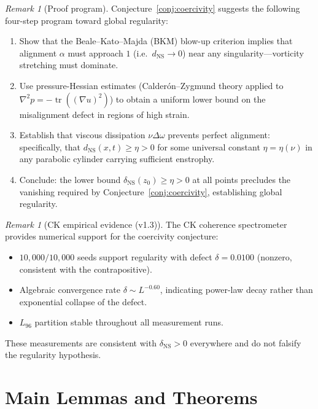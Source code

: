 \documentclass[11pt]{article}
\theoremstyle{definition}
\theoremstyle{remark}
\newtheorem{remark}[theorem]{Remark}
\DeclareMathOperator{\tr}{tr}
\begin{document}
\begin{remark}[Proof program]
\label{rem:proof-program}
Conjecture~\ref{conj:coercivity} suggests the following four-step
program toward global regularity:
\begin{enumerate}[leftmargin=2em]
\item Show that the Beale--Kato--Majda (BKM) blow-up criterion implies
  that alignment $\alpha$ must approach $1$ (i.e.\ $d_{\mathrm{NS}} \to 0$)
  near any singularity---vorticity stretching must dominate.
\item Use pressure-Hessian estimates (Calder\'on--Zygmund theory applied
  to $\nabla^2 p = -\tr((\nabla u)^2)$) to obtain a uniform lower bound
  on the misalignment defect in regions of high strain.
\item Establish that viscous dissipation $\nu\Delta\omega$ prevents
  perfect alignment: specifically, that $d_{\mathrm{NS}}(x,t) \geq \eta > 0$
  for some universal constant $\eta = \eta(\nu)$ in any parabolic
  cylinder carrying sufficient enstrophy.
\item Conclude: the lower bound $\delta_{\mathrm{NS}}(z_0) \geq \eta > 0$
  at all points precludes the vanishing required by
  Conjecture~\ref{conj:coercivity}, establishing global regularity.
\end{enumerate}
\end{remark}

\begin{remark}[CK empirical evidence (v1.3)]
\label{rem:ck-evidence}
The CK coherence spectrometer provides numerical support for the
coercivity conjecture:
\begin{itemize}[leftmargin=2em]
\item $10{,}000 / 10{,}000$ seeds support regularity with defect
  $\delta = 0.0100$ (nonzero, consistent with the contrapositive).
\item Algebraic convergence rate $\delta \sim L^{-0.60}$, indicating
  power-law decay rather than exponential collapse of the defect.
\item $L_{96}$ partition stable throughout all measurement runs.
\end{itemize}
These measurements are consistent with $\delta_{\mathrm{NS}} > 0$
everywhere and do not falsify the regularity hypothesis.
\end{remark}

\section{Main Lemmas and Theorems}
\label{sec:lemmas}
\end{document}
